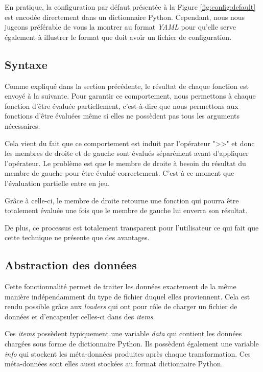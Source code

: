 		\begin{note}
			En pratique, la configuration par défaut présentée à la Figure \ref{fig:config:default} est encodée directement dans un dictionnaire Python. Cependant, nous nous jugeons préférable de vous la montrer au format \textit{YAML} pour qu'elle serve également à illustrer le format que doit avoir un fichier de configuration.
		\end{note}
		
	\subsection{Syntaxe}
	
		Comme expliqué dans la section précédente, le résultat de chaque fonction est envoyé à la suivante. Pour garantir ce comportement, nous permettons à chaque fonction d'être évaluée partiellement, c'est-à-dire que nous permettons aux fonctions d'être évaluées même si elles ne possèdent pas tous les arguments nécessaires.
		
		Cela vient du fait que ce comportement est induit par l'opérateur ">>" et donc les membres de droite et de gauche sont évalués séparément avant d'appliquer l'opérateur. Le problème est que le membre de droite à besoin du résultat du membre de gauche pour être évalué correctement. C'est à ce moment que l'évaluation partielle entre en jeu.
		
		Grâce à celle-ci, le membre de droite retourne une fonction qui pourra être totalement évaluée une fois que le membre de gauche lui enverra son résultat.
		
		De plus, ce processus est totalement transparent pour l'utilisateur ce qui fait que cette technique ne présente que des avantages. 
	
	
	\subsection{Abstraction des données}
	
		Cette fonctionnalité permet de traiter les données exactement de la même manière indépendamment du type de fichier duquel elles proviennent. Cela est rendu possible grâce aux \textit{loaders} qui ont pour rôle de charger un fichier de données et d'encapsuler celles-ci dans des \textit{items}.
		
		Ces \textit{items} possèdent typiquement une variable \textit{data} qui contient les données chargées sous forme de dictionnaire Python. Ils possèdent également une variable \textit{info} qui stockent les méta-données produites après chaque transformation. Ces méta-données sont elles aussi stockées au format dictionnaire Python.
		
